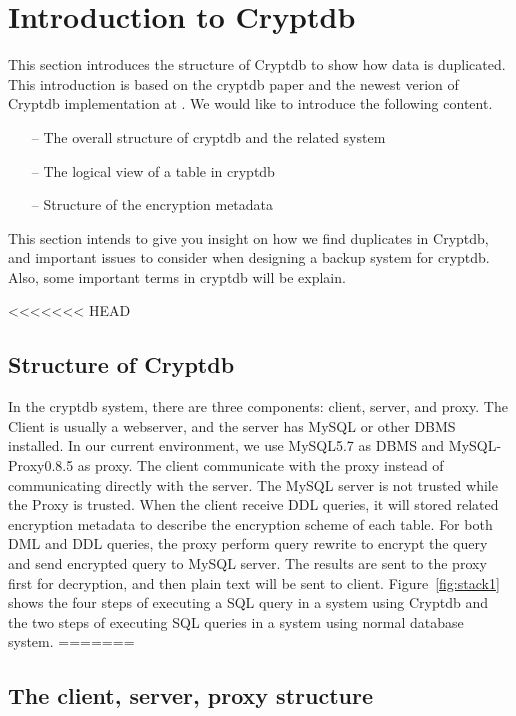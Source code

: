 \section{Introduction to Cryptdb}

This section introduces the structure of Cryptdb to show how data is duplicated. This introduction is based on the cryptdb paper\citep{popa2011cryptdb} and the newest verion of Cryptdb implementation at \citep{cryptdbsite}. We would like to introduce the following content.



\begin{itemize}
\item[--] The overall structure of cryptdb and the related system
\item[--] The logical view of a table in cryptdb
\item[--] Structure of the encryption metadata
\end{itemize}

This section intends to give you insight on how we find duplicates in Cryptdb, and important issues to consider when designing a backup system for cryptdb. Also, some important terms in cryptdb will be explain.

<<<<<<< HEAD
\subsection{Structure of Cryptdb}

In the cryptdb system, there are three components: client, server, and proxy. The Client is usually a webserver, and the server has MySQL  or other DBMS installed. In our current environment, we use MySQL5.7 as DBMS and MySQL-Proxy0.8.5 as proxy. The client communicate with the proxy instead of communicating directly with the server. The MySQL server is not trusted while the Proxy is trusted. When the client receive DDL queries, it will stored related encryption metadata to describe the encryption scheme of each table. For both DML and DDL queries, the proxy perform query rewrite to encrypt the query and send encrypted query to MySQL server. The results are sent to the proxy first for decryption, and then plain text will be sent to client. Figure~\ref{fig:stack1} shows the four steps of executing a SQL query in a system using Cryptdb and the two steps of executing SQL queries in a system using normal database system.
=======
\subsection{The client, server, proxy structure}



